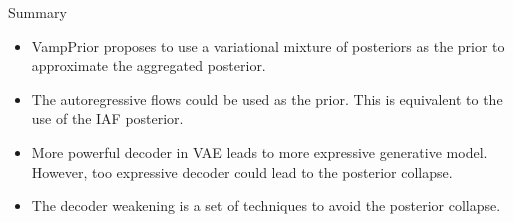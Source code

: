 \begin{frame}{Summary}
\begin{itemize}
	\item VampPrior proposes to use a variational mixture of posteriors as the prior to approximate the aggregated posterior.
	\vfill
	\item The autoregressive flows could be used as the prior. This is equivalent to the use of the IAF posterior. 
	\item More powerful decoder in VAE leads to more expressive generative model. However, too expressive decoder could lead to the posterior collapse.
	\item The decoder weakening is a set of techniques to avoid the posterior collapse.
\end{itemize}
\end{frame}
 